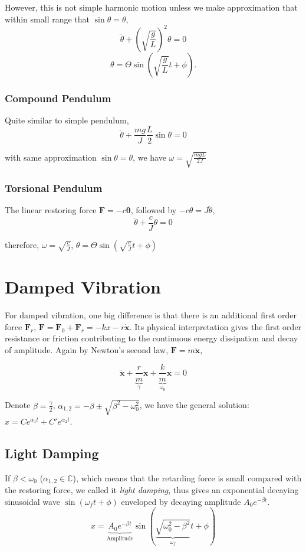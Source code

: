 \documentclass[openany]{book}
\begin{document}
However, this is not simple harmonic motion unless we make approximation that within small range that $\sin \theta =\theta $,
\[\ddot{\theta }+\left(\sqrt{\frac{g}{L}}\right)^2\theta =0\]
\[\theta =\Theta \sin (\sqrt{\frac{g}{L}} t+\phi ).\]

\subsubsection{Compound Pendulum}
Quite similar to simple pendulum,
\[\ddot{\theta}+\frac{mg}{J}\frac{L}{2} \sin \theta=0\]

with same approximation $\sin \theta =\theta $, we have $\omega =\sqrt{\frac{mgL}{2J}}$
\subsubsection{Torsional Pendulum}
The linear restoring force $\mathbf{F}=-c\bm{\theta}$, followed by $-c\theta =J\ddot{\theta}$,
\[\ddot{\theta}+\frac{c}{J}\theta=0\]

therefore, $\omega =\sqrt{\frac{c}{J}}$, $\theta =\Theta \sin \left(\sqrt{\frac{c}{J}} t+\phi \right)$
\section{Damped Vibration}
For damped vibration, one big difference is that there is an additional first order force $\mathbf{F}_r$, $\mathbf{F}=\mathbf{F}_0+\mathbf{F}_r=-kx-r\dot{\mathbf{x}}$. Its physical interpretation gives the first order resistance or friction contributing to the continuous energy dissipation and decay of amplitude. Again by Newton's second law, $\mathbf{F}=m\ddot{\mathbf{x}}$,

\begin{equation}\label{eq:4}
\ddot{\mathbf{x}}+\underbrace{\frac{r}{m}}_{\gamma }\dot{\mathbf{x}}+\underbrace{\frac{k}{m}}_{\omega _0}\mathbf{x}=0
\end{equation}

Denote $\beta =\frac{\gamma}{2}$, $\alpha _{1,2}=-\beta \pm \sqrt{\beta ^2-\omega _0^2}$, we have the general solution: $x=Ce^{\alpha _1t}+C'e^{\alpha _2t}$.
\subsection{Light Damping}
If $\beta <\omega _0$ ($\alpha _{1,2}\in \mathbb{C}$), which means that the retarding force is small compared with the restoring force, we called it \emph{light damping}, thus gives an exponential decaying sinusoidal wave $\sin (\omega _ft+\phi )$ enveloped by decaying amplitude $A_0e^{-\beta t}$.
\[x=\underbrace{A_0e^{-\beta t}}_\text{Amplitude}\sin (\underbrace{\sqrt{\omega _0^2-\beta ^2}}_{\omega _f} t+\phi )\]
\end{document}
